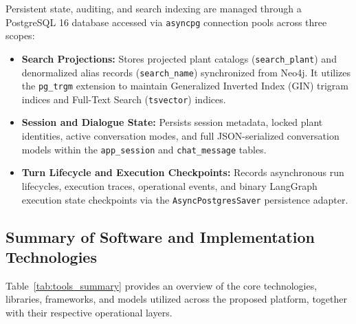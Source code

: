 Persistent state, auditing, and search indexing are managed through a PostgreSQL 16 database accessed via \texttt{asyncpg} connection pools across three scopes:
\begin{itemize}
    \item \textbf{Search Projections:} Stores projected plant catalogs (\texttt{search\_plant}) and denormalized alias records (\texttt{search\_name}) synchronized from Neo4j. It utilizes the \texttt{pg\_trgm} extension to maintain Generalized Inverted Index (GIN) trigram indices and Full-Text Search (\texttt{tsvector}) indices.
    \item \textbf{Session and Dialogue State:} Persists session metadata, locked plant identities, active conversation modes, and full JSON-serialized conversation models within the \texttt{app\_session} and \texttt{chat\_message} tables.
    \item \textbf{Turn Lifecycle and Execution Checkpoints:} Records asynchronous run lifecycles, execution traces, operational events, and binary LangGraph execution state checkpoints via the \texttt{AsyncPostgresSaver} persistence adapter.
\end{itemize}

\subsection{Summary of Software and Implementation Technologies}

Table~\ref{tab:tools_summary} provides an overview of the core technologies, libraries, frameworks, and models utilized across the proposed platform, together with their respective operational layers.

